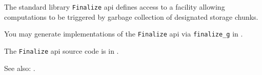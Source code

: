 
The standard library {\tt Finalize} api defines access to a facility allowing 
computations to be triggered by garbage collection of designated storage chunks.

You may generate implementations of the {\tt Finalize} api via 
{\tt finalize\_g} in .

The {\tt Finalize} api source code is in  .

See also:   .



